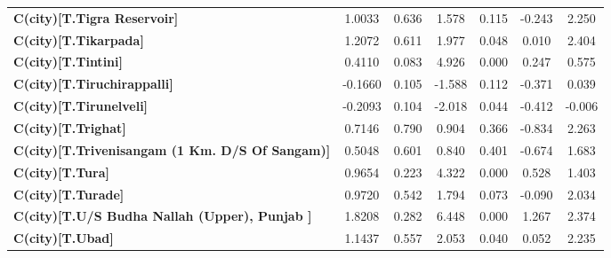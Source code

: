 \begin{center}
\begin{tabular}{lcccccc}
\textbf{C(city)[T.Tigra Reservoir]}                                                                 &       1.0033  &        0.636     &     1.578  &         0.115        &       -0.243    &        2.250     \\
\textbf{C(city)[T.Tikarpada]}                                                                       &       1.2072  &        0.611     &     1.977  &         0.048        &        0.010    &        2.404     \\
\textbf{C(city)[T.Tintini]}                                                                         &       0.4110  &        0.083     &     4.926  &         0.000        &        0.247    &        0.575     \\
\textbf{C(city)[T.Tiruchirappalli]}                                                                 &      -0.1660  &        0.105     &    -1.588  &         0.112        &       -0.371    &        0.039     \\
\textbf{C(city)[T.Tirunelveli]}                                                                     &      -0.2093  &        0.104     &    -2.018  &         0.044        &       -0.412    &       -0.006     \\
\textbf{C(city)[T.Trighat]}                                                                         &       0.7146  &        0.790     &     0.904  &         0.366        &       -0.834    &        2.263     \\
\textbf{C(city)[T.Trivenisangam (1 Km. D/S Of Sangam)]}                                             &       0.5048  &        0.601     &     0.840  &         0.401        &       -0.674    &        1.683     \\
\textbf{C(city)[T.Tura]}                                                                            &       0.9654  &        0.223     &     4.322  &         0.000        &        0.528    &        1.403     \\
\textbf{C(city)[T.Turade]}                                                                          &       0.9720  &        0.542     &     1.794  &         0.073        &       -0.090    &        2.034     \\
\textbf{C(city)[T.U/S Budha Nallah (Upper), Punjab      ]}                                          &       1.8208  &        0.282     &     6.448  &         0.000        &        1.267    &        2.374     \\
\textbf{C(city)[T.Ubad]}                                                                            &       1.1437  &        0.557     &     2.053  &         0.040        &        0.052    &        2.235     \\

\end{tabular}
\end{center}

